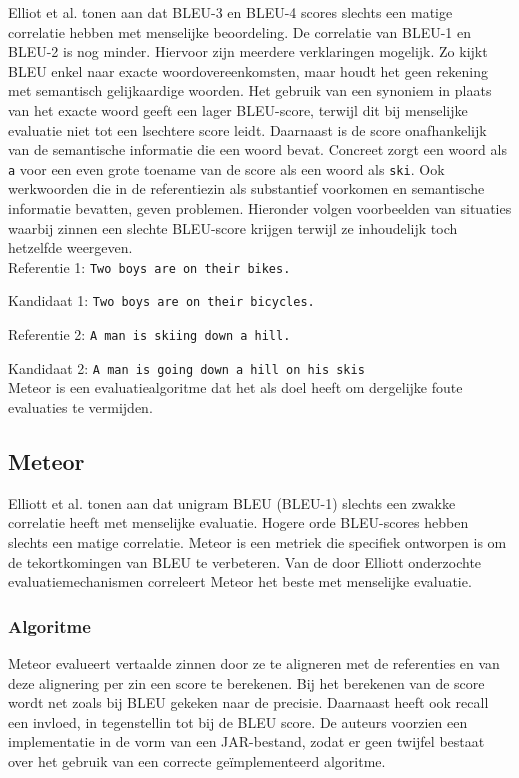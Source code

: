 Elliot et al.\cite{Elliott2014} tonen aan dat BLEU-3 en BLEU-4 scores slechts een matige correlatie hebben met menselijke beoordeling. De correlatie van BLEU-1 en BLEU-2 is nog minder.
Hiervoor zijn meerdere verklaringen mogelijk. Zo kijkt BLEU enkel naar exacte woordovereenkomsten, maar houdt het geen rekening met semantisch gelijkaardige woorden. Het gebruik van een synoniem in plaats van het exacte woord geeft een lager BLEU-score, terwijl dit bij menselijke evaluatie niet tot een lsechtere score leidt. Daarnaast is de score onafhankelijk van de semantische informatie die een woord bevat. Concreet zorgt een woord als \texttt{a} voor een even grote toename van de score als een woord als \texttt{ski}. Ook werkwoorden die in de referentiezin als substantief voorkomen en semantische informatie bevatten, geven problemen. Hieronder volgen voorbeelden van situaties waarbij zinnen een slechte BLEU-score krijgen terwijl ze inhoudelijk toch hetzelfde weergeven.
\\

Referentie 1: \texttt{Two boys are on their bikes.}

Kandidaat 1: \texttt{Two boys are on their bicycles.}

Referentie 2: \texttt{A man is skiing down a hill.}

Kandidaat 2: \texttt{A man is going down a hill on his skis}
\\

Meteor is een evaluatiealgoritme dat het als doel heeft om dergelijke foute evaluaties te vermijden.

\subsection{Meteor}
Elliott et al.\cite{Elliott2014} tonen aan dat unigram BLEU (BLEU-1) slechts een zwakke correlatie heeft met menselijke evaluatie. Hogere orde BLEU-scores hebben slechts een matige correlatie. Meteor is een metriek die specifiek ontworpen is om de tekortkomingen van BLEU te verbeteren. Van de door Elliott onderzochte evaluatiemechanismen correleert Meteor het beste met menselijke evaluatie.

\subsubsection{Algoritme}
Meteor\cite{Denkowski2007a} evalueert vertaalde zinnen door ze te aligneren met de referenties en van deze alignering per zin een score te berekenen. Bij het berekenen van de score wordt net zoals bij BLEU gekeken naar de precisie. Daarnaast heeft ook recall een invloed, in tegenstellin tot bij de BLEU score. De auteurs voorzien een implementatie in de vorm van een JAR-bestand, zodat er geen twijfel bestaat over het gebruik van een correcte ge\"implementeerd algoritme.

